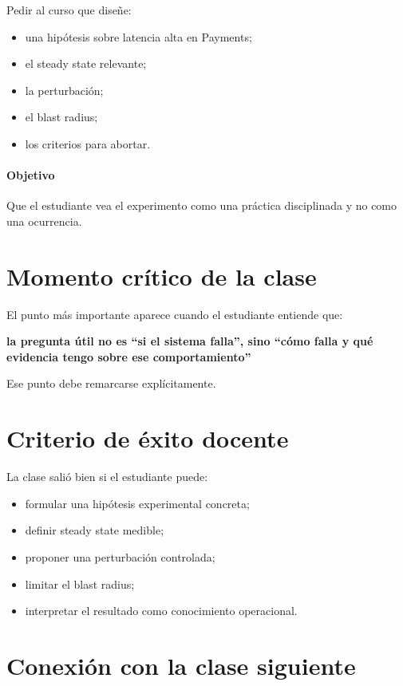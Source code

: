 \documentclass[variant=docente,cover=institutional,mode=screen]{ua-engineering-v6-article}
\begin{document}
Pedir al curso que diseñe:
\begin{itemize}
\item una hipótesis sobre latencia alta en Payments;
\item el steady state relevante;
\item la perturbación;
\item el blast radius;
\item los criterios para abortar.
\end{itemize}

\paragraph{Objetivo}
Que el estudiante vea el experimento como una práctica disciplinada y no como una ocurrencia.

\section{Momento crítico de la clase}

El punto más importante aparece cuando el estudiante entiende que:

\begin{center}
\textbf{la pregunta útil no es “si el sistema falla”, sino “cómo falla y qué evidencia tengo sobre ese comportamiento”}
\end{center}

Ese punto debe remarcarse explícitamente.

\section{Criterio de éxito docente}

La clase salió bien si el estudiante puede:

\begin{itemize}
\item formular una hipótesis experimental concreta;
\item definir steady state medible;
\item proponer una perturbación controlada;
\item limitar el blast radius;
\item interpretar el resultado como conocimiento operacional.
\end{itemize}

\section{Conexión con la clase siguiente}
\end{document}
